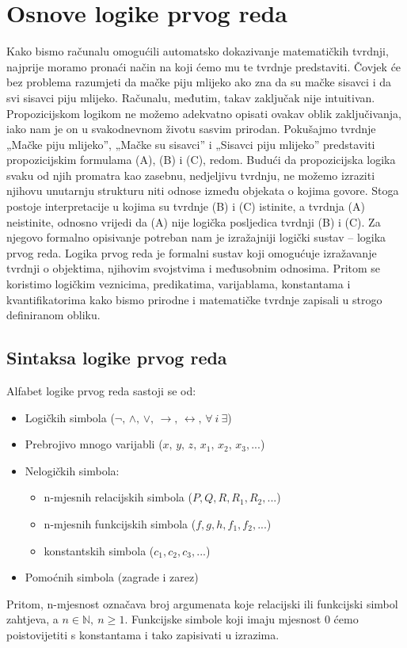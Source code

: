 \documentclass{article}
\theoremstyle{definition}
\theoremstyle{plain}
\begin{document}
\section{Osnove logike prvog reda}
Kako bismo računalu omogućili automatsko dokazivanje matematičkih tvrdnji, najprije moramo pronaći način na koji ćemo mu te tvrdnje predstaviti. Čovjek će bez problema razumjeti da mačke piju mlijeko ako zna da su mačke sisavci i da svi sisavci piju mlijeko. Računalu, međutim, takav zaključak nije intuitivan. Propozicijskom logikom ne možemo adekvatno opisati ovakav oblik zaključivanja, iako nam je on u svakodnevnom životu sasvim prirodan. Pokušajmo tvrdnje „Mačke piju mlijeko”, „Mačke su sisavci” i „Sisavci piju mlijeko” predstaviti propozicijskim formulama (A), (B) i (C), redom. Budući da propozicijska logika svaku od njih promatra kao zasebnu, nedjeljivu tvrdnju, ne možemo izraziti njihovu unutarnju strukturu niti odnose između objekata o kojima govore. Stoga postoje interpretacije u kojima su tvrdnje (B) i (C) istinite, a tvrdnja (A) neistinite, odnosno vrijedi da (A) nije logička posljedica tvrdnji (B) i (C). Za njegovo formalno opisivanje potreban nam je izražajniji logički sustav – logika prvog reda. Logika prvog reda je formalni sustav koji omogućuje izražavanje tvrdnji o objektima, njihovim svojstvima i međusobnim odnosima. Pritom se koristimo logičkim veznicima, predikatima, varijablama, konstantama i kvantifikatorima kako bismo prirodne i matematičke tvrdnje zapisali u strogo definiranom obliku.

\subsection*{Sintaksa logike prvog reda}
Alfabet logike prvog reda sastoji se od: \begin{itemize}
    \item Logičkih simbola ($\neg,\, \land,\, \lor,\, \rightarrow,\, \leftrightarrow,\, \forall\:i\: \exists$)
    \item Prebrojivo mnogo varijabli ($x,\,y,\,z,\,x_1,\,x_2,\,x_3,...$)
    \item Nelogičkih simbola:\begin{itemize}
        \item n-mjesnih relacijskih simbola ($P, Q, R, R_1, R_2,...$)
        \item n-mjesnih funkcijskih simbola ($f, g, h, f_{1} , f_{2}, ...$)
        \item konstantskih simbola ($c_1, c_2, c_3, ...$)
    \end{itemize}
    \item Pomoćnih simbola (zagrade i zarez)
    \end{itemize}
Pritom, n-mjesnost označava broj argumenata koje relacijski ili funkcijski simbol zahtjeva, a $n\in \mathbb{N},\:n\ge1$. Funkcijske simbole koji imaju mjesnost $0$ ćemo poistovijetiti s konstantama i tako zapisivati u izrazima.
\end{document}
